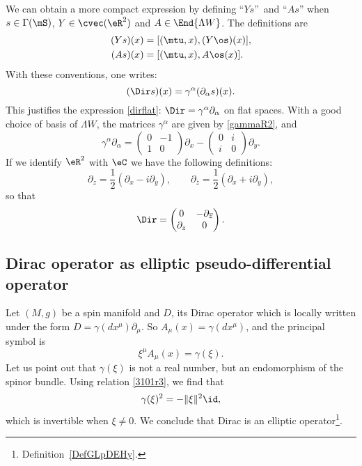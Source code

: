 We can obtain a more compact expression by defining ``$Ys$''\ and ``$As$'' when $s\in\Gamma(\mS)$, $Y\in\cvec(\eR^2)$ and $A\in\End{\Lambda W }$. The definitions are
\begin{align*}
(Ys)(x)&=[(\mtu,x),(Y\os)(x)],\\
(As)(x)&=[(\mtu,x),A\os(x)].
\end{align*}
With these conventions, one writes:
\[
(\Dir s)(x)=\gamma^{\alpha}(\partial_{\alpha} s)(x).
\]
This justifies the expression \eqref{dirflat}: $\Dir=\gamma^{\alpha}\partial_{\alpha}$ on flat spaces. With a good choice of basis of $\Lambda W $, the matrices $\gamma^{\alpha}$ are given by \eqref{gammaR2}, and
\[
\gamma^{\alpha}\partial_{\alpha}=
\begin{pmatrix}
0 & -1 \\
1 & 0
\end{pmatrix}\partial_x-
\begin{pmatrix}
0 & i \\
i & 0
\end{pmatrix}\partial_y.
\]
If we identify $\eR^2$ with $\eC$ we have the following definitions:
\[
\partial_z=\frac{1}{2}(\partial_x-i\partial_y),\qquad\partial_{\overline{z}}=\frac{1}{2}(\partial_x+i\partial_y),\]
so that
\[\Dir=\begin{pmatrix}
0 & -\partial_{\overline{z}} \\
\partial_z & 0
\end{pmatrix}.
\]

\subsection{Dirac operator as elliptic pseudo-differential operator}
\label{subSecREctBOh}

Let $(M,g)$ be a spin manifold and $D$, its Dirac operator which is locally written under the form $D=\gamma(dx^{\mu})\partial_{\mu}$. So $A_{\mu}(x)=\gamma(dx^{\mu})$, and the principal symbol is
\[
  \xi^{\mu}A_{\mu}(x)=\gamma(\xi).
\]
Let us point out that $\gamma(\xi)$ is not a real number, but an endomorphism of the spinor bundle. Using relation \eqref{3101r3}, we find that
\[
  \gamma(\xi)^2=-\| \xi \|^2\id,
\]
which is invertible when $\xi\neq 0$. We conclude that Dirac is an elliptic operator\footnote{Definition~\ref{DefGLpDEHy}.}.


